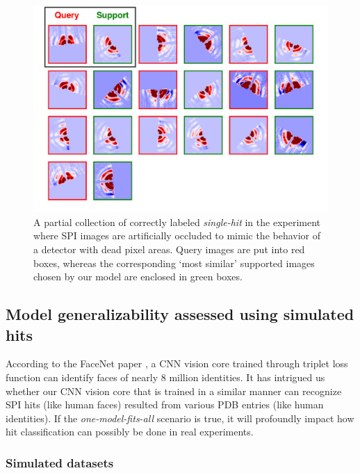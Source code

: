 \begin{figure}
\includegraphics[width=\textwidth,keepaspectratio]
{./figures/true_label.single.real.pdf}

\caption{A partial collection of correctly labeled \textit{single-hit} in the
experiment where SPI images are artificially occluded to mimic the behavior of a
detector with dead pixel areas.  Query images are put into red boxes, whereas
the corresponding `most similar' supported images chosen by our model are
enclosed in green boxes.}

\label{fig : true single real}
\end{figure}


\subsection{Model generalizability assessed using simulated hits}

According to the FaceNet paper \cite{schroffFaceNetUnifiedEmbedding2015}, a CNN
vision core trained through triplet loss function can identify faces of nearly 8
million identities.  It has intrigued us whether our CNN vision core that is
trained in a similar manner can recognize SPI hits (like human faces) resulted
from various PDB entries (like human identities).  If the
\textit{one-model-fits-all} scenario is true, it will profoundly impact how hit
classification can possibly be done in real experiments.  


\subsubsection{Simulated datasets}

